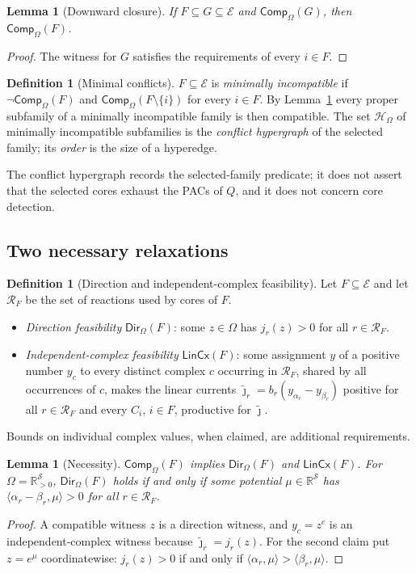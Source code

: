 \documentclass[11pt,a4paper]{article}
\theoremstyle{plain}
\newtheorem{lemma}[theorem]{Lemma}
\theoremstyle{definition}
\newtheorem{definition}[theorem]{Definition}
\theoremstyle{remark}
\newcommand{\R}{\mathbb{R}}
\newcommand{\Rpos}{\R_{>0}}
\newcommand{\cS}{\mathcal{S}}
\newcommand{\cR}{\mathcal{R}}
\newcommand{\cE}{\mathcal{E}}
\newcommand{\cH}{\mathcal{H}}
\newcommand{\Comp}{\mathsf{Comp}}
\newcommand{\DIR}{\mathsf{Dir}}
\newcommand{\LIN}{\mathsf{LinCx}}
\begin{document}
\begin{lemma}[Downward closure]\label{lem:down}
If $F\subseteq G\subseteq\cE$ and $\Comp_\Omega(G)$, then $\Comp_\Omega(F)$.
\end{lemma}
\begin{proof}
The witness for $G$ satisfies the requirements of every $i\in F$.
\end{proof}

\begin{definition}[Minimal conflicts]\label{def:minimal}
$F\subseteq\cE$ is \emph{minimally incompatible} if $\neg\Comp_\Omega(F)$ and $\Comp_\Omega(F\setminus\{i\})$ for every $i\in F$. By Lemma~\ref{lem:down} every proper subfamily of a minimally incompatible family is then compatible. The set $\cH_{\Omega}$ of minimally incompatible subfamilies is the \emph{conflict hypergraph} of the selected family; its \emph{order} is the size of a hyperedge.
\end{definition}

The conflict hypergraph records the selected-family predicate; it does not assert that the selected cores exhaust the PACs of $Q$, and it does not concern core detection.

\subsection{Two necessary relaxations}

\begin{definition}[Direction and independent-complex feasibility]\label{def:relax}
Let $F\subseteq\cE$ and let $\cR_F$ be the set of reactions used by cores of $F$.
\begin{itemize}
\item \emph{Direction feasibility} $\DIR_\Omega(F)$: some $z\in\Omega$ has $j_r(z)>0$ for all $r\in\cR_F$.
\item \emph{Independent-complex feasibility} $\LIN(F)$: some assignment $y$ of a positive number $y_c$ to every distinct complex $c$ occurring in $\cR_F$, shared by all occurrences of $c$, makes the linear currents $\tilde\jmath_r=b_r(y_{\alpha_r}-y_{\beta_r})$ positive for all $r\in\cR_F$ and every $C_i$, $i\in F$, productive for $\tilde\jmath$.
\end{itemize}
Bounds on individual complex values, when claimed, are additional requirements.
\end{definition}

\begin{lemma}[Necessity]\label{lem:necessary}
$\Comp_\Omega(F)$ implies $\DIR_\Omega(F)$ and $\LIN(F)$. For $\Omega=\Rpos^{\cS}$, $\DIR_\Omega(F)$ holds if and only if some potential $\mu\in\R^{\cS}$ has $\langle\alpha_r-\beta_r,\mu\rangle>0$ for all $r\in\cR_F$.
\end{lemma}
\begin{proof}
A compatible witness $z$ is a direction witness, and $y_c=z^c$ is an independent-complex witness because $\tilde\jmath_r=j_r(z)$. For the second claim put $z=e^{\mu}$ coordinatewise: $j_r(z)>0$ if and only if $\langle\alpha_r,\mu\rangle>\langle\beta_r,\mu\rangle$.
\end{proof}
\end{document}
